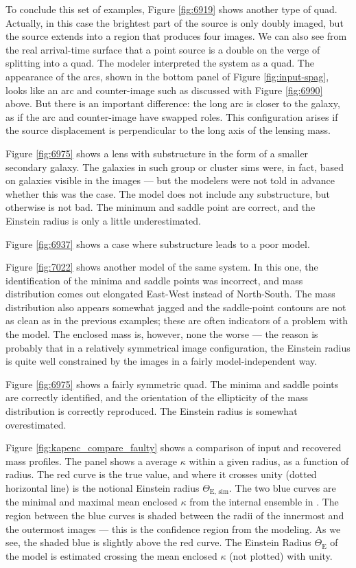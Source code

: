 To conclude this set of examples, Figure \ref{fig:6919} shows another
type of quad.  Actually, in this case the brightest part of the source
is only doubly imaged, but the source extends into a region that
produces four images.  We can also see from the real arrival-time
surface that a point source is a double on the verge of splitting into
a quad.  The modeler interpreted the system as a quad.  The
appearance of the arcs, shown in the bottom panel of Figure
\ref{fig:input-spag}, looks like an arc and counter-image such as
discussed with Figure \ref{fig:6990} above.  But there is an important
difference: the long arc is closer to the galaxy, as if the arc and
counter-image have swapped roles.  This configuration arises if the
source displacement is perpendicular to the long axis of the lensing
mass.


Figure \ref{fig:6975} shows a lens with substructure in the form of a
smaller secondary galaxy.  The galaxies in such group or cluster sims
were, in fact, based on galaxies visible in the images --- but the
modelers were not told in advance whether this was the case.  The
model does not include any substructure, but otherwise is not bad.
The minimum and saddle point are correct, and the Einstein radius is
only a little underestimated.

Figure \ref{fig:6937} shows a case where substructure leads to a
poor model.


Figure \ref{fig:7022} shows another model of the same system.  In this
one, the identification of the minima and saddle points was incorrect,
and mass distribution comes out elongated East-West instead of
North-South.  The mass distribution also appears somewhat jagged and
the saddle-point contours are not as clean as in the previous
examples; these are often indicators of a problem with the model.  The
enclosed mass is, however, none the worse --- the reason is probably
that in a relatively symmetrical image configuration, the Einstein
radius is quite well constrained by the images in a fairly
model-independent way.


Figure \ref{fig:6975} shows a fairly symmetric quad.  The minima and
saddle points are correctly identified, and the orientation of the
ellipticity of the mass distribution is correctly reproduced.  The
Einstein radius is somewhat overestimated.  

Figure \ref{fig:kapenc_compare_faulty} shows a comparison of input and
recovered mass profiles.  The panel shows a average $\kappa$ within a
given radius, as a function of radius.  The red curve is the true
value, and where it crosses unity (dotted horizontal line) is the
notional Einstein radius $\Theta_{\text{E, sim}}$.  The two blue
curves are the minimal and maximal mean enclosed $\kappa$ from the
internal ensemble in \spl.  The region between the blue curves is
shaded between the radii of the innermost and the outermost images ---
this is the confidence region from the modeling.  As we see, the
shaded blue is slightly above the red curve.  The Einstein Radius
$\Theta_\text{E}$ of the model is estimated crossing the mean enclosed
$\kappa$ (not plotted) with unity.


